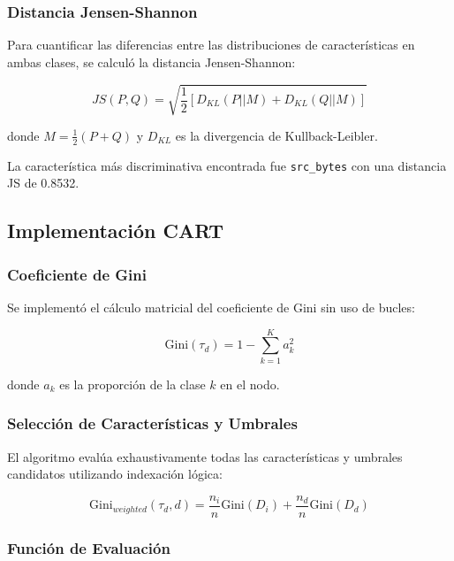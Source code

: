 \documentclass[12pt,a4paper]{article}
\begin{document}
\subsubsection{Distancia Jensen-Shannon}

Para cuantificar las diferencias entre las distribuciones de características en ambas clases, se calculó la distancia Jensen-Shannon:

\begin{equation}
JS(P,Q) = \sqrt{\frac{1}{2}[D_{KL}(P||M) + D_{KL}(Q||M)]}
\end{equation}

donde $M = \frac{1}{2}(P + Q)$ y $D_{KL}$ es la divergencia de Kullback-Leibler.

La característica más discriminativa encontrada fue \texttt{src_bytes} con una distancia JS de 0.8532.

\subsection{Implementación CART}

\subsubsection{Coeficiente de Gini}

Se implementó el cálculo matricial del coeficiente de Gini sin uso de bucles:

\begin{equation}
\text{Gini}(\tau_d) = 1 - \sum_{k=1}^{K} a_k^2
\end{equation}

donde $a_k$ es la proporción de la clase $k$ en el nodo.

\subsubsection{Selección de Características y Umbrales}

El algoritmo evalúa exhaustivamente todas las características y umbrales candidatos utilizando indexación lógica:

\begin{equation}
\text{Gini}_{weighted}(\tau_d, d) = \frac{n_i}{n}\text{Gini}(D_i) + \frac{n_d}{n}\text{Gini}(D_d)
\end{equation}

\subsubsection{Función de Evaluación}
\end{document}
